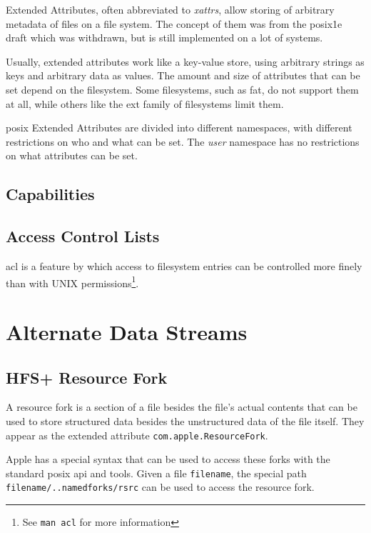 \documentclass[a4paper]{article}
\begin{document}
Extended Attributes, often abbreviated to \emph{xattrs}, allow storing of arbitrary metadata of files on a file system. The concept of them was from the \gls{posix}\.1e draft which was withdrawn, but is still implemented on a lot of systems.

Usually, extended attributes work like a key-value store, using arbitrary strings as keys and arbitrary data as values. The amount and size of attributes that can be set depend on the filesystem. Some filesystems, such as \gls{fat}, do not support them at all, while others like the \gls{ext} family of filesystems limit them.



\gls{posix} Extended Attributes are divided into different namespaces, with different restrictions on who and what can be set. The \emph{user} namespace has no restrictions on what attributes can be set. 

\subsection{Capabilities}

\subsection{Access Control Lists}

\gls{acl} is a feature by which access to filesystem entries can be controlled more finely than with UNIX permissions\footnote{See \texttt{man acl} for more information}.


\section{Alternate Data Streams}\label{sec:ads}

\subsection{HFS+ Resource Fork}

A resource fork is a section of a file besides the file's actual contents that can be used to store structured data besides the unstructured data of the file itself. They appear as the extended attribute \verb|com.apple.ResourceFork|. 

Apple has a special syntax that can be used to access these forks with the standard \gls{posix} \gls{api} and tools. Given a file \verb|filename|, the special path \verb|filename/..namedforks/rsrc| can be used to access the resource fork.
\end{document}
